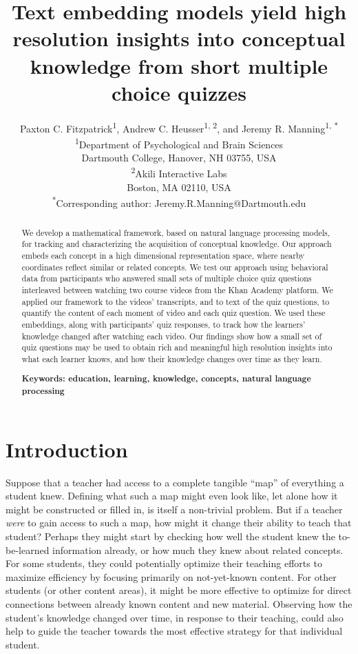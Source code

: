 \documentclass[10pt]{article}
\title{Text embedding models yield high resolution insights into conceptual
knowledge from short multiple choice quizzes}
\author{Paxton C. Fitzpatrick\textsuperscript{1},
Andrew C. Heusser\textsuperscript{1, 2}, and Jeremy R.
Manning\textsuperscript{1, *}\\\small{\textsuperscript{1}Department of Psychological and Brain Sciences}\\\small{Dartmouth College, Hanover, NH 03755, USA}\\\small{\textsuperscript{2}Akili Interactive Labs}\\\small{Boston, MA 02110, USA}\\\small{\textsuperscript{*}Corresponding author:
Jeremy.R.Manning@Dartmouth.edu}}
\date{}
\begin{document}
\maketitle

\begin{abstract}\noindent We develop a mathematical framework, based on natural
language processing models, for tracking and characterizing the acquisition of
conceptual knowledge. Our approach embeds each concept in a high dimensional
representation space, where nearby coordinates reflect similar or related
concepts. We test our approach using behavioral data from participants who
answered small sets of multiple choice quiz questions interleaved between
watching two course videos from the Khan Academy platform. We applied our
framework to the videos' transcripts, and to text of the quiz questions, to
quantify the content of each moment of video and each quiz question. We used
these embeddings, along with participants' quiz responses, to track how the
learners' knowledge changed after watching each video. Our findings show how a
small set of quiz questions may be used to obtain rich and meaningful high
resolution insights into what each learner knows, and how their knowledge
changes over time as they learn.

\textbf{Keywords: education, learning, knowledge, concepts, natural language processing}

\end{abstract}


\section*{Introduction}

Suppose that a teacher had access to a complete tangible ``map'' of everything
a student knew. Defining what such a map might even look like, let alone how it
might be constructed or filled in, is itself a non-trivial problem. But if a
teacher \textit{were} to gain access to such a map, how might it change their
ability to teach that student? Perhaps they might start by checking how well
the student knew the to-be-learned information already, or how much they knew
about related concepts. For some students, they could potentially optimize
their teaching efforts to maximize efficiency by focusing primarily on
not-yet-known content. For other students (or other content areas), it might be
more effective to optimize for direct connections between already known content
and new material. Observing how the student's knowledge changed over time, in
response to their teaching, could also help to guide the teacher towards the
most effective strategy for that individual student.
\end{document}
